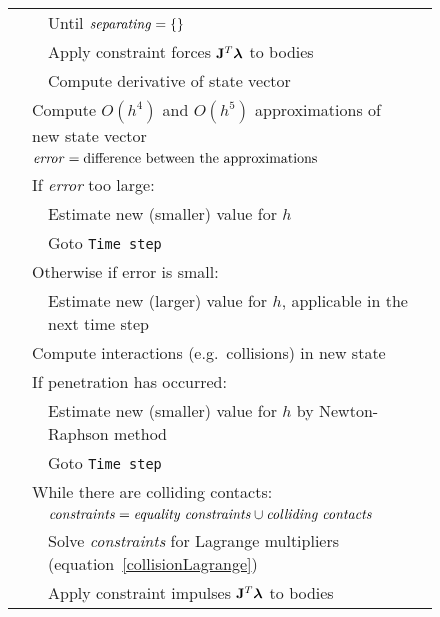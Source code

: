 \begin{figure}
\begin{tabular}{|l|l|l|l|@{}l}
        &&\multicolumn{2}{|l|}{Until $\mbox{\textit{separating}} = \{\}$}\\\cline{3-4}
        &&\multicolumn{2}{|l|}{Apply constraint forces $\m{J}^T\ve{\lambda}$ to bodies}\\\cline{3-4}
        &&\multicolumn{2}{|l|}{Compute derivative of state vector}&
        \curly{\ref{rigidBodyDynamics}}{\spx}\\\cline{2-4}
    &\multicolumn{3}{|l|}{Compute $O(h^4)$ and $O(h^5)$ approximations of new state vector}\\\cline{2-4}
    &\multicolumn{3}{|l|}{$\mbox{\textit{error}} = \mbox{difference between the approximations}$}\\\cline{2-4}
    &\multicolumn{3}{|l|}{If \textit{error} too large:}\\\cline{3-4}
        &&\multicolumn{2}{|l|}{Estimate new (smaller) value for $h$}&
        \curly{\ref{solvingODEs}}{\spx\spx\spx\spx\spx\spx\spx}\\\cline{3-4}
        &&\multicolumn{2}{|l|}{Goto \texttt{Time step}}\\\cline{2-4}
    &\multicolumn{3}{|l|}{Otherwise if error is small:}\\\cline{3-4}
        &&\multicolumn{2}{|l|}{Estimate new (larger) value for $h$, applicable in the next time step}\\\cline{2-4}
    &\multicolumn{3}{|l|}{Compute interactions (e.g.\ collisions) in new state}&
    \curly{\ref{meshIntersection}}{\spx}\\\cline{2-4}
    &\multicolumn{3}{|l|}{If penetration has occurred:}\\\cline{3-4}
        &&\multicolumn{2}{|l|}{Estimate new (smaller) value for $h$ by Newton-Raphson method}&
        \curly{\ref{findingContactTime}}{\spx\spx\spx}\\\cline{3-4}
        &&\multicolumn{2}{|l|}{Goto \texttt{Time step}}\\\cline{2-4}
    &\multicolumn{3}{|l|}{While there are colliding contacts:}\\\cline{3-4}
        &&\multicolumn{2}{|l|}{$\mbox{\textit{constraints}} = \mbox{\textit{equality constraints}}
        \cup \mbox{\textit{colliding contacts}}$}\\\cline{3-4}
        &&\multicolumn{2}{|l|}{Solve \textit{constraints} for Lagrange multipliers
        (equation~\ref{collisionLagrange})}&
        \curly{\ref{collidingContact}}{\spx\spx\spx\spx\spx}\\\cline{3-4}
        &&\multicolumn{2}{|l|}{Apply constraint impulses $\m{J}^T\ve{\lambda}$ to bodies}\\\cline{3-4}

\end{tabular}
\end{figure}
